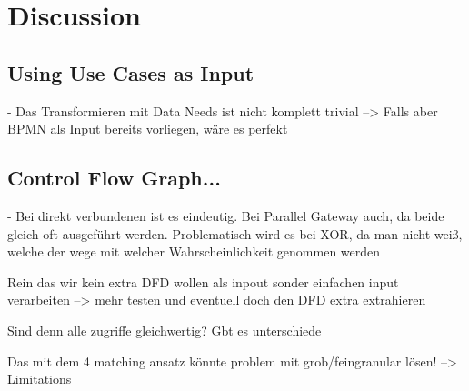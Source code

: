 \chapter{Discussion}
\label{ch:Discussion}

\section{Using Use Cases as Input}
- Das Transformieren mit Data Needs ist nicht komplett trivial --> Falls aber BPMN als Input bereits vorliegen, wäre es perfekt

\section{Control Flow Graph...}
- Bei direkt verbundenen ist es eindeutig. Bei Parallel Gateway auch, da beide gleich oft ausgeführt werden. Problematisch wird es bei XOR, da man nicht weiß, welche der wege mit welcher Wahrscheinlichkeit genommen werden



Rein das wir kein extra DFD wollen als inpout sonder einfachen input verarbeiten --> mehr testen und eventuell doch den DFD extra extrahieren


Sind denn alle zugriffe gleichwertig? Gbt es unterschiede


Das mit dem 4 matching ansatz könnte problem mit grob/feingranular lösen! --> Limitations